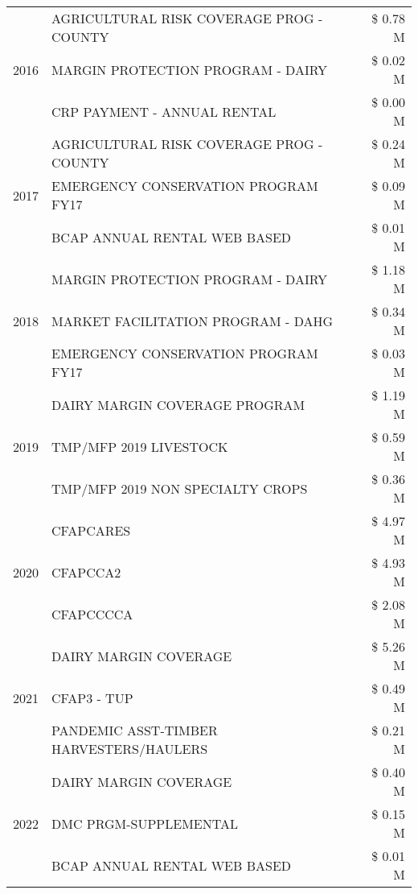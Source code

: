 \begin{tabular}{llr}
\cline{1-3}
\multirow[t]{3}{*}{2016} & AGRICULTURAL RISK COVERAGE PROG - COUNTY & \$ 0.78 M \\
 & MARGIN PROTECTION PROGRAM - DAIRY & \$ 0.02 M \\
 & CRP PAYMENT - ANNUAL RENTAL & \$ 0.00 M \\
\cline{1-3}
\multirow[t]{3}{*}{2017} & AGRICULTURAL RISK COVERAGE PROG - COUNTY & \$ 0.24 M \\
 & EMERGENCY CONSERVATION PROGRAM FY17 & \$ 0.09 M \\
 & BCAP ANNUAL RENTAL WEB BASED & \$ 0.01 M \\
\cline{1-3}
\multirow[t]{3}{*}{2018} & MARGIN PROTECTION PROGRAM - DAIRY & \$ 1.18 M \\
 & MARKET FACILITATION PROGRAM - DAHG & \$ 0.34 M \\
 & EMERGENCY CONSERVATION PROGRAM FY17 & \$ 0.03 M \\
\cline{1-3}
\multirow[t]{3}{*}{2019} & DAIRY MARGIN COVERAGE PROGRAM & \$ 1.19 M \\
 & TMP/MFP 2019 LIVESTOCK & \$ 0.59 M \\
 & TMP/MFP 2019 NON SPECIALTY CROPS & \$ 0.36 M \\
\cline{1-3}
\multirow[t]{3}{*}{2020} & CFAPCARES & \$ 4.97 M \\
 & CFAPCCA2 & \$ 4.93 M \\
 & CFAPCCCCA & \$ 2.08 M \\
\cline{1-3}
\multirow[t]{3}{*}{2021} & DAIRY MARGIN COVERAGE & \$ 5.26 M \\
 & CFAP3 - TUP & \$ 0.49 M \\
 & PANDEMIC ASST-TIMBER HARVESTERS/HAULERS & \$ 0.21 M \\
\cline{1-3}
\multirow[t]{3}{*}{2022} & DAIRY MARGIN COVERAGE & \$ 0.40 M \\
 & DMC PRGM-SUPPLEMENTAL & \$ 0.15 M \\
 & BCAP ANNUAL RENTAL WEB BASED & \$ 0.01 M \\
\cline{1-3}
\bottomrule
\end{tabular}
